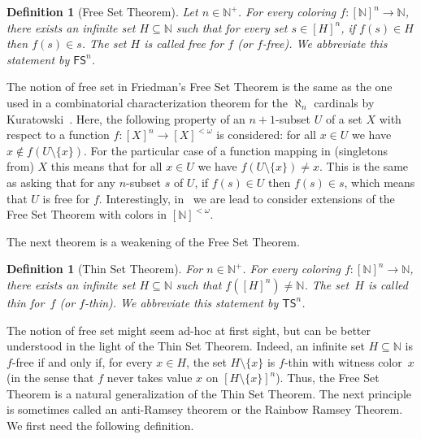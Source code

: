 \documentclass{article}
\newcommand{\FS}[0]{\mathsf{FS}}
\newcommand{\TS}[0]{\mathsf{TS}}
\newcommand{\NN}[0]{\mathbb{N}}
\numberwithin{theorem}{section}
\newtheorem{definition}[theorem]{Definition}
\newcommand{\ludovic}[1]{\textcolor{blue}{#1}}
\newcommand{\lorenzo}[1]{\textcolor{orange}{#1}}
\begin{document}
\begin{definition}[Free Set Theorem] Let $n\in\NN^+$.  
For every coloring $f:[\NN]^{n} \to \NN$, there exists an infinite set $H\subseteq \NN$ such that for every set $s\in [H]^{n}$, if $f(s) \in H$ then $f(s) \in s$. The set $H$ is called \emph{free} for $f$ (or $f$-free). We abbreviate this statement by $\FS^n$.
\end{definition}

The notion of free set in Friedman's Free Set Theorem is the same as the one used in a combinatorial characterization theorem for the $\aleph_n$ cardinals by Kuratowski~\cite{Kur:51}. Here, the following property of an $n+1$-subset $U$ of a set $X$ with respect to a function $f:[X]^n \to [X]^{<\omega}$ is considered: for all $x\in U$ we have $x \notin f(U\setminus\{x\})$. For the particular case of a function mapping in (singletons from) $X$ this means that for all $x\in U$ we have $f(U\setminus \{x\}) \neq x$. This is the same as asking that for any $n$-subset $s$ of $U$, if $f(s) \in U$ then $f(s) \in s$, which means that $U$ is free for $f$. Interestingly, in~ we are lead to consider extensions of the Free Set Theorem with colors in $[\NN]^{<\omega}$. %

The next theorem is a weakening of the Free Set Theorem. %

\begin{definition}[Thin Set Theorem] For $n\in \NN^+$. 
For every coloring $f:[\NN]^n \to \NN$, there exists an infinite set $H\subseteq \NN$ such that
$f([H]^n) \neq \NN$. The set~$H$ is called \emph{thin} for~$f$ (or $f$-thin). We abbreviate this statement by $\TS^n$.
\end{definition}

The notion of free set might seem ad-hoc at first sight, but can be better understood in the light of the Thin Set Theorem. Indeed, an infinite set $H \subseteq \NN$ is $f$-free if and only if, for every $x \in H$, the set $H \setminus \{x\}$ is $f$-thin with witness color~$x$ (in the sense that $f$ never takes value $x$ on $[H\setminus \{x\}]^n$). Thus, the Free Set Theorem is a natural generalization of the Thin Set Theorem.
The next principle is sometimes called an anti-Ramsey theorem or the Rainbow Ramsey Theorem.
We first need the following definition.
\end{document}
